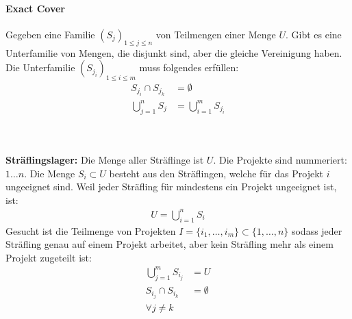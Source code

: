 \paragraph{Exact Cover} Gegeben eine Familie \( (S_j)_{1\leq j \leq n} \) von Teilmengen einer Menge \(U\). Gibt es eine Unterfamilie von Mengen, die disjunkt sind, aber die gleiche Vereinigung haben. Die Unterfamilie \( (S_{j_i})_{1\leq i \leq m} \) muss folgendes erfüllen:
\begin{align*}
    S_{j_i} \cap S_{j_k} &= \emptyset \\
    \bigcup_{j=1}^n S_j &= \bigcup_{i=1}^m S_{j_i}
\end{align*}\\
\\
\textbf{Sträflingslager:} Die Menge aller Sträflinge ist \(U\). Die Projekte sind nummeriert: \(1 \ldots n\). Die Menge \( S_i \subset U \) besteht aus den Sträflingen, welche für das Projekt \( i\) ungeeignet sind. Weil jeder Sträfling für mindestens ein Projekt ungeeignet ist, ist:
\begin{align*}
    U = \bigcup_{i=1}^n S_i
\end{align*}
Gesucht ist die Teilmenge von Projekten \( I = \{ i_1, \ldots, i_m\} \subset \{1, \ldots, n \} \) sodass jeder Sträfling genau auf einem Projekt arbeitet, aber kein Sträfling mehr als einem Projekt zugeteilt ist:
\begin{align*}
    \bigcup_{j=1}^m S_{i_j} &= U \\
    S_{i_j} \cap S_{i_k} &= \emptyset \\
    \forall j \neq k
\end{align*}

